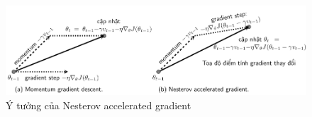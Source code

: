 \begin{figure}[t]
\centering
\includegraphics[width = \textwidth]{Chapters/04_GradientDescent/GD/latex/NAG.pdf}
\caption[]{Ý tưởng của Nesterov accelerated gradient}
\label{fig:8_mynag}
\end{figure}





